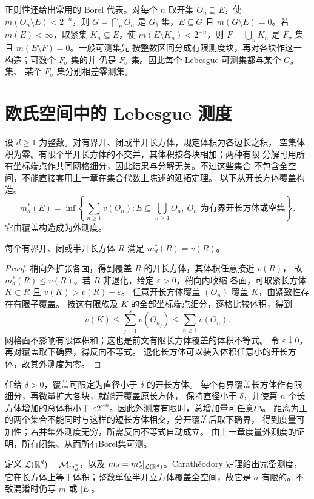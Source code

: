 正则性还给出常用的 Borel 代表。对每个 $n$ 取开集
$O_n\supseteq E$，使 $m(O_n\setminus E)<2^{-n}$，则
$G=\bigcap_nO_n$ 是 $G_\delta$ 集，$E\subseteq G$ 且
$m(G\setminus E)=0$。若 $m(E)<\infty$，取紧集
$K_n\subseteq E$，使 $m(E\setminus K_n)<2^{-n}$，则
$F=\bigcup_nK_n$ 是 $F_\sigma$ 集且 $m(E\setminus F)=0$。一般可测集先
按整数区间分成有限测度块，再对各块作这一构造；可数个 $F_\sigma$ 集的并
仍是 $F_\sigma$ 集。因此每个 Lebesgue 可测集都与某个 $G_\delta$ 集、
某个 $F_\sigma$ 集分别相差零测集。

\section{欧氏空间中的 Lebesgue 测度}

设 $d\ge1$ 为整数。对有界开、闭或半开长方体，规定体积为各边长之积，
空集体积为零。有限个半开长方体的不交并，其体积按各块相加；两种有限
分解可用所有坐标端点作共同网格细分，因此结果与分解无关。不过这些集合
不包含全空间，不能直接套用上一章在集合代数上陈述的延拓定理。
以下从开长方体覆盖构造。
\[
 m_d^*(E)=\inf\left\{\sum_{n\ge1}v(O_n):
 E\subseteq\bigcup_{n\ge1}O_n,\ O_n\text{ 为有界开长方体或空集}\right\}.
\]
它由覆盖构造成为外测度。

\begin{proposition}
每个有界开、闭或半开长方体 $R$ 满足 $m_d^*(R)=v(R)$。
\end{proposition}
\begin{proof}
稍向外扩张各面，得到覆盖 $R$ 的开长方体，其体积任意接近 $v(R)$，
故 $m_d^*(R)\le v(R)$。若 $R$ 非退化，给定 $\varepsilon>0$，稍向内收缩
各面，可取紧长方体 $K\subset R$ 且 $v(K)>v(R)-\varepsilon$。
任意开长方体覆盖 $(O_n)$ 覆盖 $K$，由紧致性存在有限子覆盖。
按这有限族及 $K$ 的全部坐标端点细分，逐格比较体积，得到
\[
 v(K)\le\sum_{j=1}^s v(O_{n_j})\le\sum_{n\ge1}v(O_n).
\]
网格面不影响有限体积和；这也是前文有限长方体覆盖的体积不等式。
令 $\varepsilon\downarrow0$，再对覆盖取下确界，得反向不等式。
退化长方体可以装入体积任意小的开长方体，故其外测度为零。
\end{proof}

任给 $\delta>0$，覆盖可限定为直径小于 $\delta$ 的开长方体。
每个有界覆盖长方体作有限细分，再微量扩大各块，就能开覆盖原长方体，
保持直径小于 $\delta$，并使第 $n$ 个长方体增加的总体积小于
$\varepsilon2^{-n}$。因此外测度有限时，总增加量可任意小。
距离为正的两个集合不能同时与这样的短长方体相交，分开覆盖后取下确界，
得到度量可加性；若并集外测度无穷，所需反向不等式自动成立。
由上一章度量外测度的证明，所有闭集、从而所有Borel集可测。

定义 $\mathcal L(\mathbb{R}^d)=\mathcal M_{m_d^*}$，以及
$m_d=m_d^*|_{\mathcal L(\mathbb{R}^d)}$。Carathéodory 定理给出完备测度，
它在长方体上等于体积；整数单位半开立方体覆盖全空间，故它是
$\sigma$-有限的。不致混淆时仍写 $m$ 或 $|E|$。

